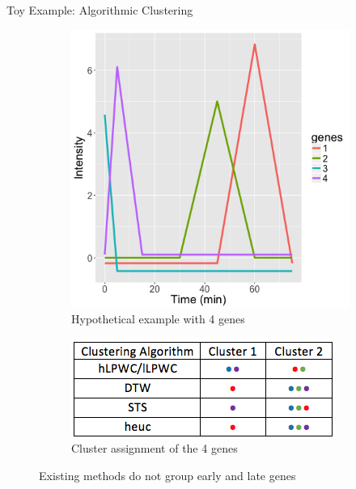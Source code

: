 \documentclass[10pt]{beamer}
\begin{document}
\begin{frame}{Toy Example: Algorithmic Clustering}
    \begin{figure}
    \centering
        \begin{subfigure}{.5\textwidth}
          \centering
          \includegraphics[width=1\linewidth]{Toy.png}
          \caption{Hypothetical example with 4 genes}
          \label{fig:sub1}
        \end{subfigure}%
        \begin{subfigure}{.5\textwidth}
          \centering
          \includegraphics[width=1\linewidth]{TableCluster.png}
          \caption{Cluster assignment of the 4 genes}
          \label{fig:sub2}
        \end{subfigure}
    \caption{Existing methods do not group early and late genes}
    \label{fig:test}
    \end{figure}
\end{frame}
\end{document}
